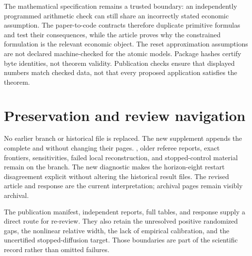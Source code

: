 The mathematical specification remains a trusted boundary: an independently programmed arithmetic check can still share an incorrectly stated economic assumption. The paper-to-code contracts therefore duplicate primitive formulas and test their consequences, while the article proves why the constrained formulation is the relevant economic object. The reset approximation assumptions are not declared machine-checked for the atomic models. Package hashes certify byte identities, not theorem validity. Publication checks ensure that displayed numbers match checked data, not that every proposed application satisfies the theorem.

\section{Preservation and review navigation}
No earlier branch or historical file is replaced. The new supplement appends the complete  and  without changing their pages. , older referee reports, exact frontiers, sensitivities, failed local reconstruction, and stopped-control material remain on the branch. The new diagnostic makes the horizon-eight restart disagreement explicit without altering the historical result files. The revised article and response are the current interpretation; archival pages remain visibly archival.

The publication manifest, independent reports, full tables, and response supply a direct route for re-review. They also retain the unresolved positive randomized gaps, the nonlinear relative width, the lack of empirical calibration, and the uncertified stopped-diffusion target. Those boundaries are part of the scientific record rather than omitted failures.


